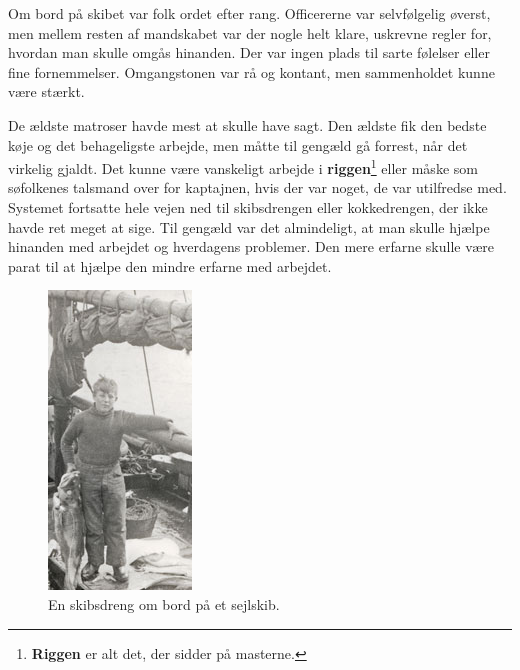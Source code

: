 Om bord på skibet var folk ordet efter rang. Officererne var
selvfølgelig øverst, men mellem resten af mandskabet var der nogle helt
klare, uskrevne regler for, hvordan man skulle omgås hinanden. Der var
ingen plads til sarte følelser eller fine fornemmelser. Omgangstonen var
rå og kontant, men sammenholdet kunne være stærkt.

De ældste matroser havde mest at skulle have sagt. Den ældste fik den
bedste køje og det behageligste arbejde, men måtte til gengæld gå
forrest, når det virkelig gjaldt. Det kunne være vanskeligt arbejde i
\textbf{riggen}\footnote{\textbf{Riggen} er alt det, der sidder på
  masterne.} eller måske som søfolkenes talsmand over for kaptajnen,
hvis der var noget, de var utilfredse med. Systemet fortsatte hele vejen
ned til skibsdrengen eller kokkedrengen, der ikke havde ret meget at
sige. Til gengæld var det almindeligt, at man skulle hjælpe hinanden med
arbejdet og hverdagens problemer. Den mere erfarne skulle være parat til
at hjælpe den mindre erfarne med arbejdet.

\begin{figure}
\centering
\includegraphics{images/sejlskibe_tema-3-skibsdreng.jpg}
\caption{En skibsdreng om bord på et sejlskib.}
\end{figure}


